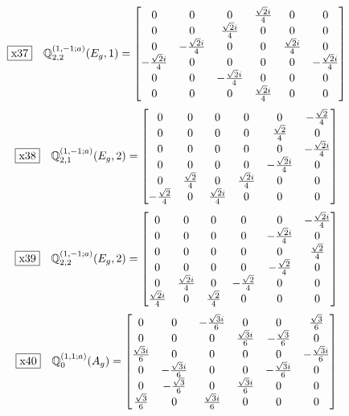 \documentclass[fleqn,10pt,landscape]{jsarticle}
\begin{document}
\begin{dmath*}
\fbox{x37}\quad \mathbb{Q}_{2,2}^{(1,-1;a)}(E_{g},1)=\begin{bmatrix} 0 & 0 & 0 & \frac{\sqrt{2} i}{4} & 0 & 0 \\ 0 & 0 & \frac{\sqrt{2} i}{4} & 0 & 0 & 0 \\ 0 & - \frac{\sqrt{2} i}{4} & 0 & 0 & \frac{\sqrt{2} i}{4} & 0 \\ - \frac{\sqrt{2} i}{4} & 0 & 0 & 0 & 0 & - \frac{\sqrt{2} i}{4} \\ 0 & 0 & - \frac{\sqrt{2} i}{4} & 0 & 0 & 0 \\ 0 & 0 & 0 & \frac{\sqrt{2} i}{4} & 0 & 0 \end{bmatrix}
\end{dmath*}
\begin{dmath*}
\fbox{x38}\quad \mathbb{Q}_{2,1}^{(1,-1;a)}(E_{g},2)=\begin{bmatrix} 0 & 0 & 0 & 0 & 0 & - \frac{\sqrt{2}}{4} \\ 0 & 0 & 0 & 0 & \frac{\sqrt{2}}{4} & 0 \\ 0 & 0 & 0 & 0 & 0 & - \frac{\sqrt{2} i}{4} \\ 0 & 0 & 0 & 0 & - \frac{\sqrt{2} i}{4} & 0 \\ 0 & \frac{\sqrt{2}}{4} & 0 & \frac{\sqrt{2} i}{4} & 0 & 0 \\ - \frac{\sqrt{2}}{4} & 0 & \frac{\sqrt{2} i}{4} & 0 & 0 & 0 \end{bmatrix}
\end{dmath*}
\begin{dmath*}
\fbox{x39}\quad \mathbb{Q}_{2,2}^{(1,-1;a)}(E_{g},2)=\begin{bmatrix} 0 & 0 & 0 & 0 & 0 & - \frac{\sqrt{2} i}{4} \\ 0 & 0 & 0 & 0 & - \frac{\sqrt{2} i}{4} & 0 \\ 0 & 0 & 0 & 0 & 0 & \frac{\sqrt{2}}{4} \\ 0 & 0 & 0 & 0 & - \frac{\sqrt{2}}{4} & 0 \\ 0 & \frac{\sqrt{2} i}{4} & 0 & - \frac{\sqrt{2}}{4} & 0 & 0 \\ \frac{\sqrt{2} i}{4} & 0 & \frac{\sqrt{2}}{4} & 0 & 0 & 0 \end{bmatrix}
\end{dmath*}
\begin{dmath*}
\fbox{x40}\quad \mathbb{Q}_{0}^{(1,1;a)}(A_{g})=\begin{bmatrix} 0 & 0 & - \frac{\sqrt{3} i}{6} & 0 & 0 & \frac{\sqrt{3}}{6} \\ 0 & 0 & 0 & \frac{\sqrt{3} i}{6} & - \frac{\sqrt{3}}{6} & 0 \\ \frac{\sqrt{3} i}{6} & 0 & 0 & 0 & 0 & - \frac{\sqrt{3} i}{6} \\ 0 & - \frac{\sqrt{3} i}{6} & 0 & 0 & - \frac{\sqrt{3} i}{6} & 0 \\ 0 & - \frac{\sqrt{3}}{6} & 0 & \frac{\sqrt{3} i}{6} & 0 & 0 \\ \frac{\sqrt{3}}{6} & 0 & \frac{\sqrt{3} i}{6} & 0 & 0 & 0 \end{bmatrix}
\end{dmath*}
\end{document}
